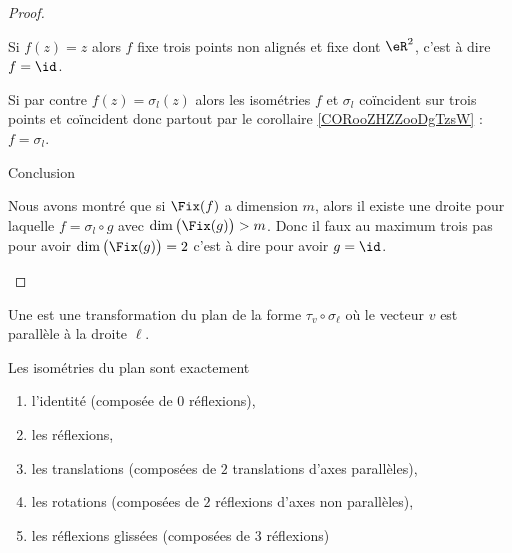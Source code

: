 \begin{proof}
\begin{subproof}
            Si \( f(z)=z\) alors \( f\) fixe trois points non alignés et fixe dont \( \eR^2\), c'est à dire \( f=\id\).

            Si par contre \( f(z)=\sigma_l(z)\) alors les isométries \( f\) et \( \sigma_l\) coïncident sur trois points et coïncident donc partout par le corollaire \ref{CORooZHZZooDgTzsW} : \( f=\sigma_l\).
        \item[Conclusion]

            Nous avons montré que si \( \Fix(f)\) a dimension \( m\), alors il existe une droite pour laquelle \( f=\sigma_l\circ g\) avec \( \dim\big( \Fix(g) \big)>m\). Donc il faux au maximum trois pas pour avoir \( \dim\big( \Fix(g) \big)=2\) c'est à dire pour avoir \( g=\id\).
    \end{subproof}
\end{proof}

\begin{definition}
    Une  est une transformation du plan de la forme \( \tau_v\circ\sigma_{\ell}\) où le vecteur \( v\) est parallèle à la droite \( \ell\).
\end{definition}

\begin{theorem}      \label{THOooVRNOooAgaVRN}
    Les isométries du plan sont exactement
    \begin{enumerate}
        \item
            l'identité (composée de \( 0\) réflexions),
        \item
            les réflexions,
        \item
            les translations (composées de \( 2\) translations d'axes parallèles),
        \item
            les rotations (composées de \( 2\) réflexions d'axes non parallèles),
        \item
            les réflexions glissées (composées de \( 3\) réflexions)
    \end{enumerate}
\end{theorem}

